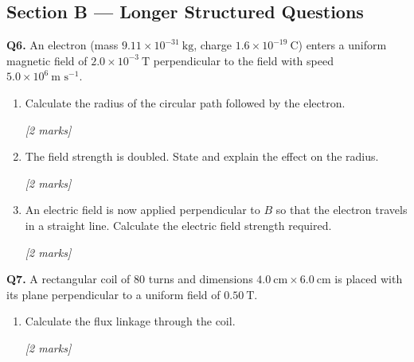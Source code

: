 \subsection*{Section B — Longer Structured Questions}

\begin{tcolorbox}[colback=white, colframe=midblue, breakable]

\begin{minipage}{\linewidth}
\textbf{Q6.} An electron (mass $9.11\times10^{-31}\ \text{kg}$, charge $1.6\times10^{-19}\ \text{C}$) enters a uniform magnetic field of $2.0\times10^{-3}\ \text{T}$ perpendicular to the field with speed $5.0\times10^6\ \text{m s}^{-1}$.
\end{minipage}

\begin{enumerate}[label=(\alph*)]
  \item \begin{minipage}[t]{\linewidth}
  Calculate the radius of the circular path followed by the electron.
  \par\hfill\textit{[2 marks]}
  \vspace{3cm}
  \end{minipage}

  \item \begin{minipage}[t]{\linewidth}
  The field strength is doubled. State and explain the effect on the radius.
  \par\hfill\textit{[2 marks]}
  \vspace{3cm}
  \end{minipage}

  \item \begin{minipage}[t]{\linewidth}
  An electric field is now applied perpendicular to $B$ so that the electron travels in a straight line. Calculate the electric field strength required.
  \par\hfill\textit{[2 marks]}
  \vspace{3cm}
  \end{minipage}
\end{enumerate}

\begin{minipage}{\linewidth}
\textbf{Q7.} A rectangular coil of 80 turns and dimensions $4.0\ \text{cm} \times 6.0\ \text{cm}$ is placed with its plane perpendicular to a uniform field of $0.50\ \text{T}$.

\begin{enumerate}[label=(\alph*)]
  \item Calculate the flux linkage through the coil.
  \par\hfill\textit{[2 marks]}
  \vspace{3cm}


\end{enumerate}
\end{minipage}
\end{tcolorbox}
